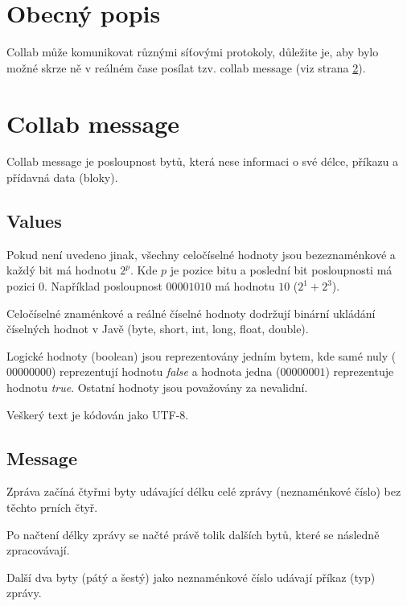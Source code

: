 \documentclass[12pt,oneside,a4paper]{report}
\begin{document}
\tableofcontents
\newpage

\chapter{Obecný popis}

Collab může komunikovat různými síťovými protokoly, důležite je, aby bylo možné skrze ně v reálném čase posílat tzv. collab message (viz strana \ref{text.collab_message}).

\chapter{Collab message}
\label{text.collab_message}

Collab message je posloupnost bytů, která nese informaci o své délce, příkazu a přídavná data (bloky).

\section{Values}

Pokud není uvedeno jinak, všechny celočíselné hodnoty jsou bezeznaménkové a každý bit má hodnotu $2^{p}$. Kde $p$ je pozice bitu a poslední bit posloupnosti má pozici $0$. Například posloupnost $00001010$ má hodnotu $10$ ($2^1 + 2^3$).

Celočíselné znaménkové a reálné číselné hodnoty dodržují binární ukládání číselných hodnot v Javě (byte, short, int, long, float, double).

Logické hodnoty (boolean) jsou reprezentovány jedním bytem, kde samé nuly ($00000000$) reprezentují hodnotu \emph{false} a hodnota jedna ($00000001$) reprezentuje hodnotu \emph{true}. Ostatní hodnoty jsou považovány za nevalidní.

Veškerý text je kódován jako UTF-8.

\section{Message}


Zpráva začíná čtyřmi byty udávající délku celé zprávy (neznaménkové číslo) bez těchto prních čtyř.

Po načtení délky zprávy se načté právě tolik dalších bytů, které se následně zpracovávají.

Další dva byty (pátý a šestý) jako neznaménkové číslo udávají příkaz (typ) zprávy.
\end{document}
